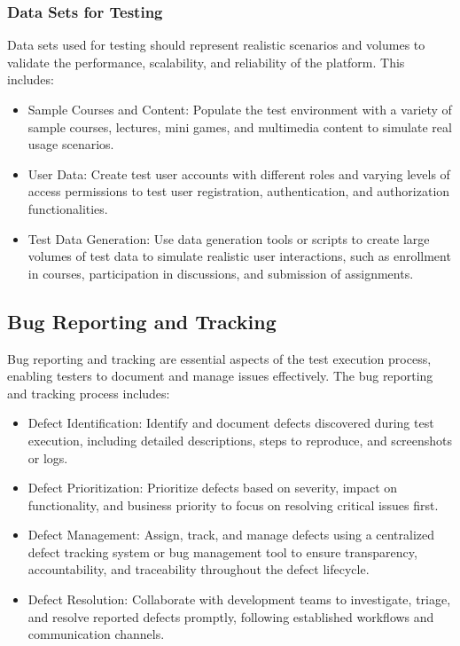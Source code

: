 		\subsubsection{Data Sets for Testing}
		
		Data sets used for testing should represent realistic scenarios and volumes to validate the performance, scalability, and reliability of the platform. This includes:
		
		\begin{itemize}
			\item Sample Courses and Content: Populate the test environment with a variety of sample courses, lectures, mini games, and multimedia content to simulate real usage scenarios.
			\item User Data: Create test user accounts with different roles and varying levels of access permissions to test user registration, authentication, and authorization functionalities.
			\item Test Data Generation: Use data generation tools or scripts to create large volumes of test data to simulate realistic user interactions, such as enrollment in courses, participation in discussions, and submission of assignments.
		\end{itemize}
		
	\subsection{Bug Reporting and Tracking}
	
	Bug reporting and tracking are essential aspects of the test execution process, enabling testers to document and manage issues effectively. The bug reporting and tracking process includes:
	
	\begin{itemize}
		\item Defect Identification: Identify and document defects discovered during test execution, including detailed descriptions, steps to reproduce, and screenshots or logs.
		\item Defect Prioritization: Prioritize defects based on severity, impact on functionality, and business priority to focus on resolving critical issues first.
		\item Defect Management: Assign, track, and manage defects using a centralized defect tracking system or bug management tool to ensure transparency, accountability, and traceability throughout the defect lifecycle.
		\item Defect Resolution: Collaborate with development teams to investigate, triage, and resolve reported defects promptly, following established workflows and communication channels.
	\end{itemize}

		